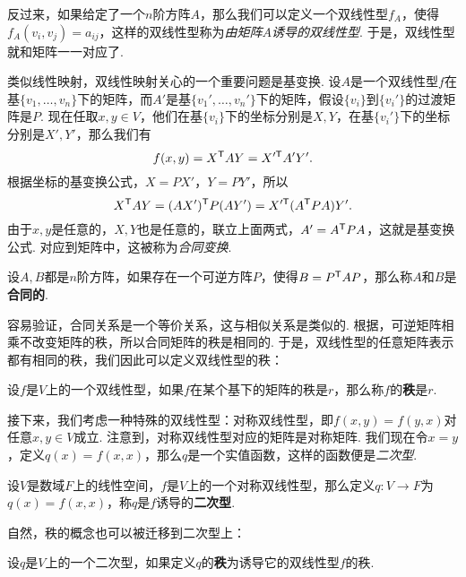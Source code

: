 反过来，如果给定了一个$n$阶方阵$A$，那么我们可以定义一个双线性型$f_A$，使得$f_A(v_i,v_j)=a_{ij}$，这样的双线性型称为\emph{由矩阵$A$诱导的双线性型}. 于是，双线性型就和矩阵一一对应了. 

类似线性映射，双线性映射关心的一个重要问题是基变换. 设$A$是一个双线性型$f$在基$\{v_1,\dots,v_n\}$下的矩阵，而$A'$是基$\{v_1',\dots,v_n'\}$下的矩阵，假设$\{v_i\}$到$\{v_i'\}$的过渡矩阵是$P$. 现在任取$x,y\in V$，他们在基$\{v_i\}$下的坐标分别是$X,Y$，在基$\{v_i'\}$下的坐标分别是$X',Y'$，那么我们有
\[
    f(x,y)=X^{\mathsf{T}} AY=X'^{\mathsf{T}} A'Y'.
\]
根据坐标的基变换公式，$X=PX'$，$Y=PY'$，所以
\[
    X^{\mathsf{T}} AY=(AX')^{\mathsf{T}} P(AY')=X'^{\mathsf{T}} (A^{\mathsf{T}} P A)Y'.
\]
由于$x,y$是任意的，$X,Y$也是任意的，联立上面两式，$A'=A^{\mathsf{T}} P A$，这就是基变换公式. 对应到矩阵中，这被称为\emph{合同变换}. 

\begin{definition}[合同矩阵]\label{def:congruent-matrix}
    设$A,B$都是$n$阶方阵，如果存在一个可逆方阵$P$，使得$B=P^{\mathsf{T}} A P$，那么称$A$和$B$是\textbf{合同的}. 
\end{definition}

容易验证，合同关系是一个等价关系，这与相似关系是类似的. 根据，可逆矩阵相乘不改变矩阵的秩，所以合同矩阵的秩是相同的. 于是，双线性型的任意矩阵表示都有相同的秩，我们因此可以定义双线性型的秩：

\begin{definition}[双线性型的秩]\label{def:bilinear-form-rank}
    设$f$是$V$上的一个双线性型，如果$f$在某个基下的矩阵的秩是$r$，那么称$f$的\textbf{秩}是$r$.
\end{definition}

接下来，我们考虑一种特殊的双线性型：对称双线性型，即$f(x,y)=f(y,x)$对任意$x,y\in V$成立. 注意到，对称双线性型对应的矩阵是对称矩阵. 我们现在令$x=y$，定义$q(x)=f(x,x)$，那么$q$是一个实值函数，这样的函数便是\emph{二次型}. 

\begin{definition}[二次型]\label{def:quadratic-form}
    设$V$是数域$F$上的线性空间，$f$是$V$上的一个对称双线性型，那么定义$q:V\to F$为$q(x)=f(x,x)$，称$q$是$f$诱导的\textbf{二次型}. 
\end{definition}

自然，秩的概念也可以被迁移到二次型上：
\begin{definition}[二次型的秩]\label{def:quadratic-form-rank}
设$q$是$V$上的一个二次型，如果定义$q$的\textbf{秩}为诱导它的双线性型$f$的秩. 
\end{definition}

